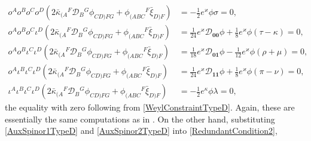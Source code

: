 \documentclass[10pt,a4paper]{article}
\newcommand\omicron{o}
\theoremstyle{plain}
\begin{document}
\begin{align*}
\omicron^A \omicron^B \omicron^C \omicron^D \left(2\bar{\kappa}_{(A}{}^{F}\mathcal{D}_{B}{}^{G}\phi_{CD)FG} + \phi_{(ABC}{}^{F}\bar{\xi}_{D)F}\right) 
&=- \tfrac{1}{2} e^{\varkappa}\phi \sigma=0,\\
\omicron^A \omicron^B \omicron^C \iota^D \left(2\bar{\kappa}_{(A}{}^{F}\mathcal{D}_{B}{}^{G}\phi_{CD)FG} + \phi_{(ABC}{}^{F}\bar{\xi}_{D)F}\right) & =\tfrac{1}{24} e^{\varkappa} \mathcal{D}_{\bm0\bm0}\phi + \tfrac{1}{8} e^{\varkappa}\phi (\tau - \kappa)  =0,\\
 \omicron^A \omicron^B \iota^C \iota^D \left(2\bar{\kappa}_{(A}{}^{F}\mathcal{D}_{B}{}^{G}\phi_{CD)FG} + \phi_{(ABC}{}^{F}\bar{\xi}_{D)F}\right) 
& = \tfrac{1}{18} e^{\varkappa} \mathcal{D}_{\bm0\bm1}\phi - \tfrac{1}{12} e^{\varkappa}\phi (\rho + \mu)  = 0,\\
 \omicron^A \iota^B \iota^C \iota^D \left(2\bar{\kappa}_{(A}{}^{F}\mathcal{D}_{B}{}^{G}\phi_{CD)FG} + \phi_{(ABC}{}^{F}\bar{\xi}_{D)F}\right) & =\tfrac{1}{24} e^{\varkappa} \mathcal{D}_{\bm1\bm1}\phi + \tfrac{1}{8} e^{\varkappa} \phi(\pi-\nu)  = 0,\\
 \iota^A \iota^B \iota^C \iota^D \left(2\bar{\kappa}_{(A}{}^{F}\mathcal{D}_{B}{}^{G}\phi_{CD)FG} + \phi_{(ABC}{}^{F}\bar{\xi}_{D)F}\right) & = - \tfrac{1}{2} e^{\kappa} \phi \lambda = 0,
\end{align*}
the equality with zero following from
\eqref{WeylConstraintTypeD}. Again, these are essentially the same
computations as in \cite{BaeVal10c}.  On the other hand, substituting
\eqref{AuxSpinor1TypeD} and \eqref{AuxSpinor2TypeD} into
\eqref{RedundantCondition2},
\end{document}
